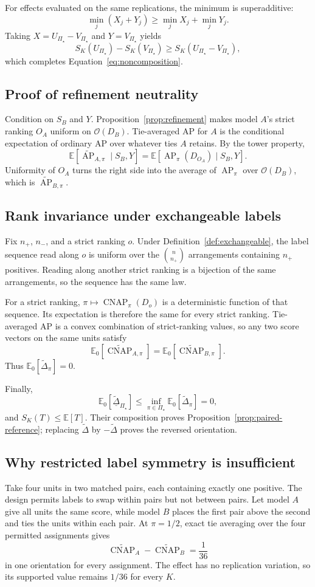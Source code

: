 \documentclass[11pt]{article}
\newcommand{\AP}{\operatorname{AP}}
\newcommand{\CNAP}{\operatorname{CNAP}}
\newcommand{\PSet}{\Pi_\star}
\newcommand{\E}{\mathbb{E}}
\newcommand{\APta}{\widetilde{\AP}}
\newcommand{\CNAPta}{\widetilde{\CNAP}}
\newcommand{\Dta}{\widetilde{\Delta}}
\newcommand{\RobDta}{\underline{\widetilde{\Delta}}_{\PSet}}
\theoremstyle{remark}
\begin{document}
For effects evaluated on the same replications, the minimum is superadditive:
\[
\min_j(X_j+Y_j)
\geq
\min_jX_j+\min_jY_j.
\]
Taking $X=U_{\PSet}-V_{\PSet}$ and $Y=V_{\PSet}$ yields
\[
S_K(U_{\PSet})-S_K(V_{\PSet})
\geq
S_K(U_{\PSet}-V_{\PSet}),
\]
which completes Equation~\eqref{eq:noncomposition}.

\subsection{Proof of refinement neutrality}

Condition on $S_B$ and $Y$. Proposition~\ref{prop:refinement} makes model $A$'s strict ranking $O_A$ uniform on $\mathcal O(D_B)$. Tie-averaged AP for $A$ is the conditional expectation of ordinary AP over whatever ties $A$ retains. By the tower property,
\[
\E[\APta_{A,\pi}\mid S_B,Y]
=
\E[\AP_\pi(D_{O_A})\mid S_B,Y].
\]
Uniformity of $O_A$ turns the right side into the average of $\AP_\pi$ over $\mathcal O(D_B)$, which is $\APta_{B,\pi}$.

\subsection{Rank invariance under exchangeable labels}

Fix $n_+$, $n_-$, and a strict ranking $o$. Under Definition~\ref{def:exchangeable}, the label sequence read along $o$ is uniform over the $\binom n{n_+}$ arrangements containing $n_+$ positives. Reading along another strict ranking is a bijection of the same arrangements, so the sequence has the same law.

For a strict ranking, $\pi\mapsto\CNAP_\pi(D_o)$ is a deterministic function of that sequence. Its expectation is therefore the same for every strict ranking. Tie-averaged AP is a convex combination of strict-ranking values, so any two score vectors on the same units satisfy
\[
\E_0[\CNAPta_{A,\pi}]
=
\E_0[\CNAPta_{B,\pi}].
\]
Thus $\E_0[\Dta_\pi]=0$.

Finally,
\[
\E_0[\RobDta]
\leq
\inf_{\pi\in\PSet}\E_0[\Dta_\pi]
=0,
\]
and $S_K(T)\leq\E[T]$. Their composition proves Proposition~\ref{prop:paired-reference}; replacing $\Dta$ by $-\Dta$ proves the reversed orientation.

\subsection{Why restricted label symmetry is insufficient}

Take four units in two matched pairs, each containing exactly one positive. The design permits labels to swap within pairs but not between pairs. Let model $A$ give all units the same score, while model $B$ places the first pair above the second and ties the units within each pair. At $\pi=1/2$, exact tie averaging over the four permitted assignments gives
\[
\CNAPta_A-\CNAPta_B
=
\frac1{36}
\]
in one orientation for every assignment. The effect has no replication variation, so its supported value remains $1/36$ for every $K$.
\end{document}
